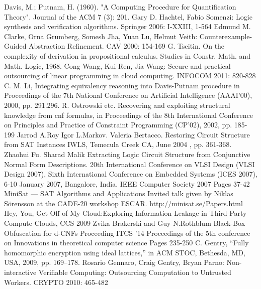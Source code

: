 \documentclass[runningheads,a4paper]{llncs}
\begin{document}
\begin{thebibliography}{4}


	Davis, M.; Putnam, H. (1960). "A Computing Procedure for Quantification Theory". Journal of the ACM 7 (3): 201.
	Gary D. Hachtel, Fabio Somenzi: Logic synthesis and verification algorithms. Springer 2006: I-XXIII, 1-564
	Edmund M. Clarke, Orna Grumberg, Somesh Jha, Yuan Lu, Helmut Veith: Counterexample-Guided Abstraction Refinement. CAV 2000: 154-169
	G. Tseitin. On the complexity of derivation in propositional calculus. Studies in Constr. Math. and Math. Logic, 1968.
	Cong Wang, Kui Ren, Jia Wang: Secure and practical outsourcing of linear programming in cloud computing. INFOCOM 2011: 820-828
	C. M. Li, Integrating equivalency reasoning into Davis-Putnam procedure in Proceedings of the 7th National Conference on Artificial Intelligence (AAAI'00), 2000, pp. 291.296.
	R. Ostrowski etc. Recovering and exploiting structural knowledge from cnf formulas, in Proceedings of the 8th International Conference on Principles and Practice of Constraint Programming (CP'02), 2002, pp. 185-199
	Jarrod A.Roy Igor L.Markov. Valeria Bertacco. Restoring Circuit Structure from SAT Instances IWLS, Temecula Creek CA, June 2004 , pp. 361-368.
	Zhaohui Fu. Sharad Malik Extracting Logic Circuit Structure from Conjunctive Normal Form Descriptions. 20th International Conference on VLSI Design (VLSI Design 2007), Sixth International Conference on Embedded Systems (ICES 2007), 6-10 January 2007, Bangalore, India. IEEE Computer Society 2007 Pages 37-42
	MiniSat — SAT Algorithms and Applications Invited talk given by Niklas Sörensson at the CADE-20 workshop ESCAR. http://minisat.se/Papers.html
	Hey, You, Get Off of My Cloud:Exploring Information Leakage in Third-Party Compute Clouds, CCS 2009
	Zvika Brakerski and Guy N.Rothblum Black-Box Obfuscation for d-CNFs  Proceeding ITCS '14 Proceedings of the 5th conference on Innovations in theoretical computer science Pages 235-250
	C. Gentry, “Fully homomorphic encryption using ideal lattices,” in ACM STOC, Bethesda, MD, USA, 2009, pp. 169–178.
	Rosario Gennaro, Craig Gentry, Bryan Parno: Non-interactive Verifiable Computing: Outsourcing Computation to Untrusted Workers. CRYPTO 2010: 465-482

\end{thebibliography}
\end{document}
